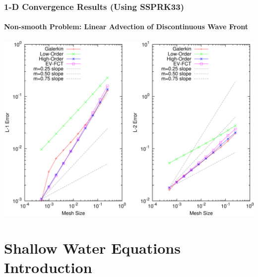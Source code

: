 \documentclass{beamer} \useoutertheme{infolines}
\begin{document}
\begin{frame}
\frametitle{1-D Convergence Results (Using SSPRK33)}
\framesubtitle{Non-smooth Problem: Linear Advection of Discontinuous Wave Front}

\begin{center}
\includegraphics[height=0.8\textheight]{./figures/convergence_absorber_SSPRK33.pdf}
\end{center}

\end{frame}
\section{Shallow Water Equations Introduction}
\end{document}
